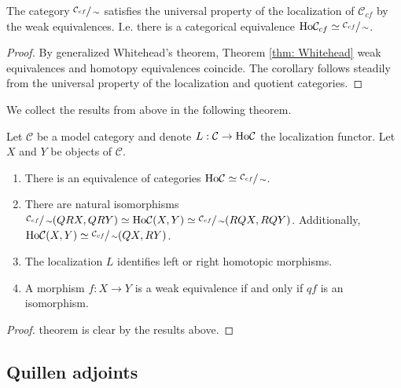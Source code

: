 \documentclass[../thesis.tex]{subfiles}
\begin{document}
            \begin{corollary}
                The category $\sfrac{\mathcal{C}_{cf}}{\sim}$ satisfies the universal property of the localization of $\mathcal{C}_{cf}$ by the weak equivalences. I.e. there is a categorical equivalence $\tt{Ho}\mathcal{C}_{cf} \simeq \sfrac{\mathcal{C}_{cf}}{\sim}$.
            \end{corollary}

            \begin{proof}
                By generalized Whitehead's theorem, Theorem \ref{thm: Whitehead} weak equivalences and homotopy equivalences coincide. The corollary follows steadily from the universal property of the localization and quotient categories. 
            \end{proof}

            We collect the results from above in the following theorem.

            \begin{thm}\label{thm: Fundamental-thm-model}
                Let $\mathcal{C}$ be a model category and denote $L: \mathcal{C} \rightarrow \tt{Ho}\mathcal{C}$ the localization functor. Let $X$ and $Y$ be objects of $\mathcal{C}$.
                \begin{enumerate}
                    \item There is an equivalence of categories $\tt{Ho}\mathcal{C}\simeq \sfrac{\mathcal{C}_{cf}}{\sim}$.
                    \item There are natural isomorphisms $\sfrac{\mathcal{C}_{cf}}{\sim}(QRX,QRY)\simeq \tt{Ho}\mathcal{C}(X, Y) \simeq \sfrac{\mathcal{C}_{cf}}{\sim}(RQX, RQY)$. Additionally, $\tt{Ho}\mathcal{C}(X, Y)\simeq \sfrac{\mathcal{C}_{cf}}{\sim}(QX, RY)$.
                    \item The localization $L$ identifies left or right homotopic morphisms.
                    \item A morphism $f: X \rightarrow Y$ is a weak equivalence if and only if $qf$ is an isomorphism.
                \end{enumerate}
            \end{thm}

            \begin{proof}
                 theorem is clear by the results above.
            \end{proof}

        \subsection{Quillen adjoints}
\end{document}
